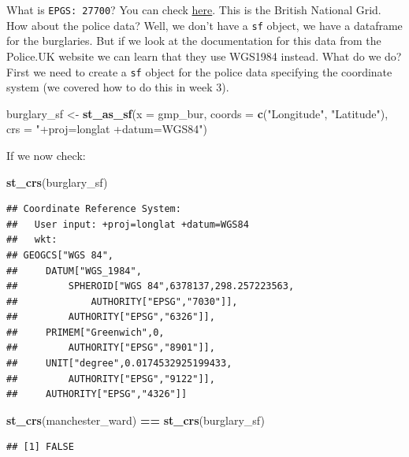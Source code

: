 \documentclass[]{book}
\newenvironment{Shaded}{\begin{snugshade}}{\end{snugshade}}
\newcommand{\DataTypeTok}[1]{\textcolor[rgb]{0.13,0.29,0.53}{#1}}
\newcommand{\KeywordTok}[1]{\textcolor[rgb]{0.13,0.29,0.53}{\textbf{#1}}}
\newcommand{\NormalTok}[1]{#1}
\newcommand{\OperatorTok}[1]{\textcolor[rgb]{0.81,0.36,0.00}{\textbf{#1}}}
\newcommand{\StringTok}[1]{\textcolor[rgb]{0.31,0.60,0.02}{#1}}
\begin{document}
What is \texttt{EPGS:\ 27700}? You can check \href{https://epsg.io/27700}{here}. This is the British National Grid. How about the police data? Well, we don't have a \texttt{sf} object, we have a dataframe for the burglaries. But if we look at the documentation for this data from the Police.UK website we can learn that they use WGS1984 instead. What do we do? First we need to create a \texttt{sf} object for the police data specifying the coordinate system (we covered how to do this in week 3).

\begin{Shaded}
\begin{Highlighting}[]
\NormalTok{burglary_sf <-}\StringTok{ }\KeywordTok{st_as_sf}\NormalTok{(}\DataTypeTok{x =}\NormalTok{ gmp_bur, }
                        \DataTypeTok{coords =} \KeywordTok{c}\NormalTok{(}\StringTok{"Longitude"}\NormalTok{, }\StringTok{"Latitude"}\NormalTok{),}
                        \DataTypeTok{crs =} \StringTok{"+proj=longlat +datum=WGS84"}\NormalTok{)}
\end{Highlighting}
\end{Shaded}

If we now check:

\begin{Shaded}
\begin{Highlighting}[]
\KeywordTok{st_crs}\NormalTok{(burglary_sf)}
\end{Highlighting}
\end{Shaded}

\begin{verbatim}
## Coordinate Reference System:
##   User input: +proj=longlat +datum=WGS84 
##   wkt:
## GEOGCS["WGS 84",
##     DATUM["WGS_1984",
##         SPHEROID["WGS 84",6378137,298.257223563,
##             AUTHORITY["EPSG","7030"]],
##         AUTHORITY["EPSG","6326"]],
##     PRIMEM["Greenwich",0,
##         AUTHORITY["EPSG","8901"]],
##     UNIT["degree",0.0174532925199433,
##         AUTHORITY["EPSG","9122"]],
##     AUTHORITY["EPSG","4326"]]
\end{verbatim}

\begin{Shaded}
\begin{Highlighting}[]
\KeywordTok{st_crs}\NormalTok{(manchester_ward) }\OperatorTok{==}\StringTok{ }\KeywordTok{st_crs}\NormalTok{(burglary_sf)}
\end{Highlighting}
\end{Shaded}

\begin{verbatim}
## [1] FALSE
\end{verbatim}
\end{document}
